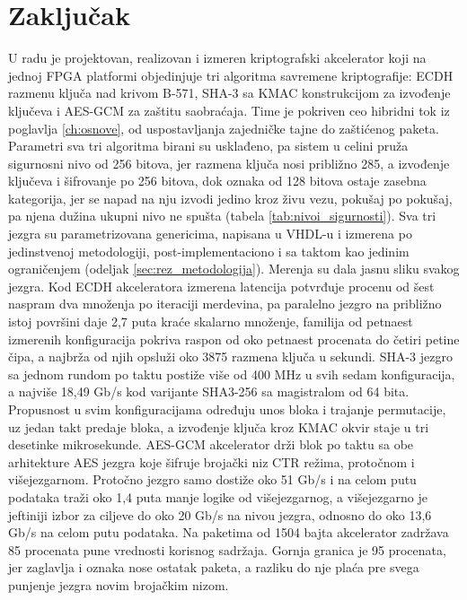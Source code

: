 \chapter{Zaključak}
\label{ch:zakljucak}

U radu je projektovan, realizovan i izmeren kriptografski akcelerator koji na jednoj FPGA platformi objedinjuje tri algoritma savremene kriptografije: ECDH razmenu ključa nad krivom B-571, SHA-3 sa KMAC konstrukcijom za izvođenje ključeva i AES-GCM za zaštitu saobraćaja. Time je pokriven ceo hibridni tok iz poglavlja \ref{ch:osnove}, od uspostavljanja zajedničke tajne do zaštićenog paketa. Parametri sva tri algoritma birani su usklađeno, pa sistem u celini pruža sigurnosni nivo od 256 bitova, jer razmena ključa nosi približno 285, a izvođenje ključeva i šifrovanje po 256 bitova, dok oznaka od 128 bitova ostaje zasebna kategorija, jer se napad na nju izvodi jedino kroz živu vezu, pokušaj po pokušaj, pa njena dužina ukupni nivo ne spušta (tabela \ref{tab:nivoi_sigurnosti}). Sva tri jezgra su parametrizovana genericima, napisana u VHDL-u i izmerena po jedinstvenoj metodologiji, post-implementaciono i sa taktom kao jedinim ograničenjem (odeljak \ref{sec:rez_metodologija}).
\smallbreak
Merenja su dala jasnu sliku svakog jezgra. Kod ECDH akceleratora izmerena latencija potvrđuje procenu od šest naspram dva množenja po iteraciji merdevina, pa paralelno jezgro na približno istoj površini daje 2,7 puta kraće skalarno množenje, familija od petnaest izmerenih konfiguracija pokriva raspon od oko petnaest procenata do četiri petine čipa, a najbrža od njih opsluži oko 3875 razmena ključa u sekundi. SHA-3 jezgro sa jednom rundom po taktu postiže više od 400 MHz u svih sedam konfiguracija, a najviše 18,49 Gb/s kod varijante SHA3-256 sa magistralom od 64 bita. Propusnost u svim konfiguracijama određuju unos bloka i trajanje permutacije, uz jedan takt predaje bloka, a izvođenje ključa kroz KMAC okvir staje u tri desetinke mikrosekunde. AES-GCM akcelerator drži blok po taktu sa obe arhitekture AES jezgra koje šifruje brojački niz CTR režima, protočnom i višejezgarnom. Protočno jezgro samo dostiže oko 51 Gb/s i na celom putu podataka traži oko 1,4 puta manje logike od višejezgarnog, a višejezgarno je jeftiniji izbor za ciljeve do oko 20 Gb/s na nivou jezgra, odnosno do oko 13,6 Gb/s na celom putu podataka. Na paketima od 1504 bajta akcelerator zadržava 85 procenata pune vrednosti korisnog sadržaja. Gornja granica je 95 procenata, jer zaglavlja i oznaka nose ostatak paketa, a razliku do nje plaća pre svega punjenje jezgra novim brojačkim nizom.
